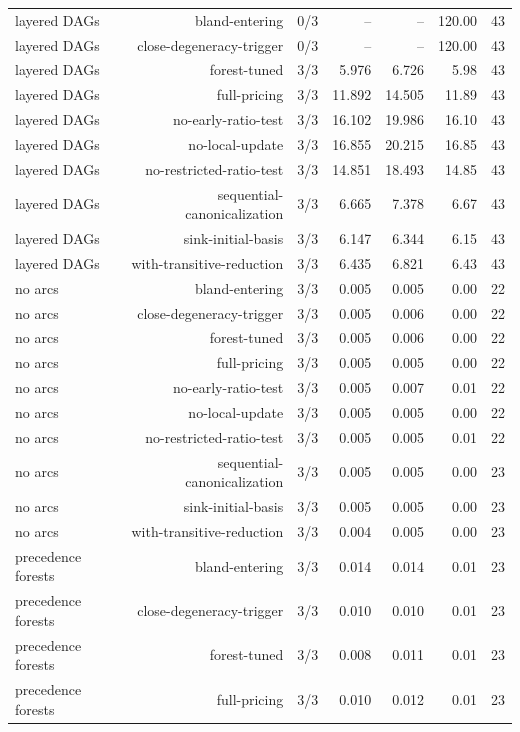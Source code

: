 {\begin{longtable}{lrrrrrr}
layered DAGs & bland-entering & 0/3 & -- & -- & 120.00 & 43 \\
layered DAGs & close-degeneracy-trigger & 0/3 & -- & -- & 120.00 & 43 \\
layered DAGs & forest-tuned & 3/3 & 5.976 & 6.726 & 5.98 & 43 \\
layered DAGs & full-pricing & 3/3 & 11.892 & 14.505 & 11.89 & 43 \\
layered DAGs & no-early-ratio-test & 3/3 & 16.102 & 19.986 & 16.10 & 43 \\
layered DAGs & no-local-update & 3/3 & 16.855 & 20.215 & 16.85 & 43 \\
layered DAGs & no-restricted-ratio-test & 3/3 & 14.851 & 18.493 & 14.85 & 43 \\
layered DAGs & sequential-canonicalization & 3/3 & 6.665 & 7.378 & 6.67 & 43 \\
layered DAGs & sink-initial-basis & 3/3 & 6.147 & 6.344 & 6.15 & 43 \\
layered DAGs & with-transitive-reduction & 3/3 & 6.435 & 6.821 & 6.43 & 43 \\
no arcs & bland-entering & 3/3 & 0.005 & 0.005 & 0.00 & 22 \\
no arcs & close-degeneracy-trigger & 3/3 & 0.005 & 0.006 & 0.00 & 22 \\
no arcs & forest-tuned & 3/3 & 0.005 & 0.006 & 0.00 & 22 \\
no arcs & full-pricing & 3/3 & 0.005 & 0.005 & 0.00 & 22 \\
no arcs & no-early-ratio-test & 3/3 & 0.005 & 0.007 & 0.01 & 22 \\
no arcs & no-local-update & 3/3 & 0.005 & 0.005 & 0.00 & 22 \\
no arcs & no-restricted-ratio-test & 3/3 & 0.005 & 0.005 & 0.01 & 22 \\
no arcs & sequential-canonicalization & 3/3 & 0.005 & 0.005 & 0.00 & 23 \\
no arcs & sink-initial-basis & 3/3 & 0.005 & 0.005 & 0.00 & 23 \\
no arcs & with-transitive-reduction & 3/3 & 0.004 & 0.005 & 0.00 & 23 \\
precedence forests & bland-entering & 3/3 & 0.014 & 0.014 & 0.01 & 23 \\
precedence forests & close-degeneracy-trigger & 3/3 & 0.010 & 0.010 & 0.01 & 23 \\
precedence forests & forest-tuned & 3/3 & 0.008 & 0.011 & 0.01 & 23 \\
precedence forests & full-pricing & 3/3 & 0.010 & 0.012 & 0.01 & 23 \\

\end{longtable}}
